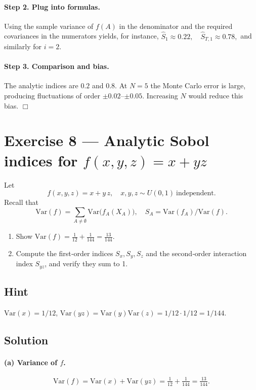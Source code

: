 \documentclass[a4paper]{article}
\begin{document}
\paragraph{Step 2. Plug into formulas.}
Using the sample variance of $f(A)$ in the denominator and the required
covariances in the numerators yields, for instance,
\(
\hat S_1\approx0.22,\quad \hat S_{T,1}\approx0.78,
\)
and similarly for $i=2$.

\paragraph{Step 3. Comparison and bias.}
The analytic indices are $0.2$ and $0.8$.  At $N=5$ the Monte Carlo
error is large, producing fluctuations of order $\pm0.02$–$\pm0.05$.
Increasing $N$ would reduce this bias.  \hfill\(\Box\)

\section*{Exercise 8 — Analytic Sobol indices for $f(x,y,z)=x+yz$}
\label{ex:Sobol_analytic_improved}

Let
\[
f(x,y,z)=x + y\,z,
\quad
x,y,z\sim U(0,1)\ \text{independent}.
\]
Recall that
\[
\text{Var}(f)
=\sum_{A\neq\emptyset} \text{Var}\bigl(f_A(X_A)\bigr),
\quad
S_A = \text{Var}(f_A)/\text{Var}(f).
\]

\begin{enumerate}%
  \item Show
        \(\text{Var}(f)=\tfrac{1}{12} + \tfrac{1}{144} = \tfrac{13}{144}.\)
  \item Compute the first‐order indices $S_x,S_y,S_z$ and the second‐order
        interaction index $S_{yz}$, and verify they sum to 1.
\end{enumerate}

\subsection*{Hint}
\(\text{Var}(x)=1/12\), \(\text{Var}(yz)=\text{Var}(y)\text{Var}(z)=1/12\cdot1/12=1/144\).

\subsection*{Solution}

\paragraph{(a) Variance of $f$.}
\[
\text{Var}(f) = \text{Var}(x) + \text{Var}(yz)
         = \tfrac{1}{12} + \tfrac{1}{144}
         = \tfrac{13}{144}.
\]
\end{document}
